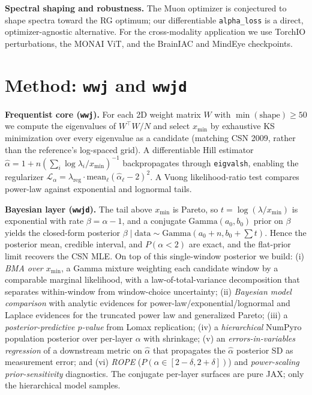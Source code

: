 \documentclass{article} %
\begin{document}
\textbf{Spectral shaping and robustness.} The Muon optimizer \citep{jordan2024muon} is conjectured to
shape spectra toward the RG optimum; our differentiable \texttt{alpha\_loss} is a direct,
optimizer-agnostic alternative. For the cross-modality application we use TorchIO
\citep{perezgarcia2021torchio} perturbations, the MONAI \citep{cardoso2022monai} ViT, and the BrainIAC
\citep{brainiac2024} and MindEye \citep{scotti2024realtime} checkpoints.

\section{Method: \texttt{wwj} and \texttt{wwjd}}
\label{sec:method}

\textbf{Frequentist core (\texttt{wwj}).} For each 2D weight matrix $W$ with $\min(\text{shape}) \geq 50$
we compute the eigenvalues of $W^\top W / N$ and select $x_{\min}$ by exhaustive KS minimization over
every eigenvalue as a candidate (matching CSN 2009, rather than the reference's log-spaced grid). A
differentiable Hill estimator $\hat\alpha = 1 + n(\sum_i \log \lambda_i / x_{\min})^{-1}$ backpropagates
through \texttt{eigvalsh}, enabling the regularizer $\mathcal{L}_\alpha = \lambda_{\text{reg}}
\cdot \text{mean}_\ell(\hat\alpha_\ell - 2)^2$. A Vuong likelihood-ratio test compares power-law against
exponential and lognormal tails.

\textbf{Bayesian layer (\texttt{wwjd}).} The tail above $x_{\min}$ is Pareto, so $t = \log(\lambda/x_{\min})$
is exponential with rate $\beta = \alpha - 1$, and a conjugate $\text{Gamma}(a_0, b_0)$ prior on $\beta$
yields the closed-form posterior $\beta \mid \text{data} \sim \text{Gamma}(a_0 + n, b_0 + \sum t)$. Hence
the posterior mean, credible interval, and $P(\alpha < 2)$ are exact, and the flat-prior limit recovers the
CSN MLE. On top of this single-window posterior we build: (i) \emph{BMA over $x_{\min}$}, a Gamma mixture
weighting each candidate window by a comparable marginal likelihood, with a law-of-total-variance
decomposition that separates within-window from window-choice uncertainty; (ii) \emph{Bayesian model
comparison} with analytic evidences for power-law/exponential/lognormal and Laplace evidences for the
truncated power law and generalized Pareto; (iii) a \emph{posterior-predictive $p$-value} from Lomax
replication; (iv) a \emph{hierarchical} NumPyro population posterior over per-layer $\alpha$ with shrinkage;
(v) an \emph{errors-in-variables regression} of a downstream metric on $\hat\alpha$ that propagates the
$\hat\alpha$ posterior SD as measurement error; and (vi) \emph{ROPE} ($P(\alpha \in [2-\delta, 2+\delta])$)
and \emph{power-scaling prior-sensitivity} diagnostics. The conjugate per-layer surfaces are pure JAX; only
the hierarchical model samples.
\end{document}
